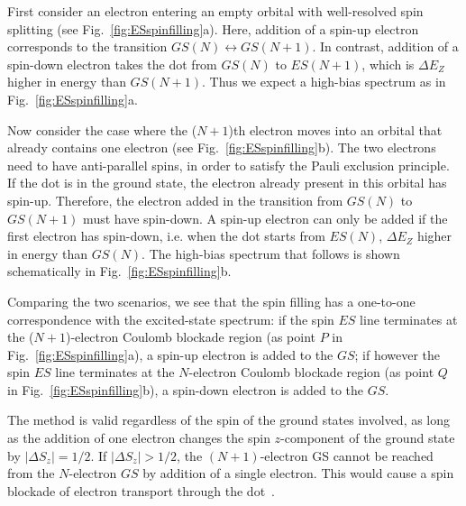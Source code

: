 \documentclass[12pt,aps,nofootinbib]{revtex4-1}
\begin{document}
First consider an electron entering an empty orbital with
well-resolved spin splitting (see Fig.~\ref{fig:ESspinfilling}a).
Here, addition of a spin-up electron corresponds to the transition
$GS(N)\leftrightarrow GS(N\!+\!1)$. In contrast, addition of a
spin-down electron takes the dot from $GS(N)$ to $ES(N\!+\!1)$,
which is $\Delta E_{Z}$ higher in energy than $GS(N\!+\!1)$. Thus
we expect a high-bias spectrum as in
Fig.~\ref{fig:ESspinfilling}a.

Now consider the case where the ($N\!+\!1$)th electron moves into
an orbital that already contains one electron (see
Fig.~\ref{fig:ESspinfilling}b). The two electrons need to have
anti-parallel spins, in order to satisfy the Pauli exclusion
principle. If the dot is in the ground state, the electron already
present in this orbital has spin-up. Therefore, the electron added
in the transition from $GS(N)$ to $GS(N\!+\!1)$ must have
spin-down. A spin-up electron can only be added if the first
electron has spin-down, i.e. when the dot starts from $ES(N)$,
$\Delta E_{Z}$ higher in energy than $GS(N)$. The high-bias
spectrum that follows is shown schematically in
Fig.~\ref{fig:ESspinfilling}b.

Comparing the two scenarios, we see that the spin filling has a
one-to-one correspondence with the excited-state spectrum: if the
spin $ES$ line terminates at the ($N\!+\!1$)-electron Coulomb
blockade region (as point $P$ in Fig.~\ref{fig:ESspinfilling}a), a
spin-up electron is added to the $GS$; if however the spin $ES$
line terminates at the $N$-electron Coulomb blockade region (as
point $Q$ in Fig.~\ref{fig:ESspinfilling}b), a spin-down electron
is added to the $GS$.

The method is valid regardless of the spin of the ground states
involved, as long as the addition of one electron changes the spin
$z$-component of the ground state by $\left|\Delta
S_z\right|=1/2$. If $|\Delta S_z|>1/2$, the $(N+1)$-electron GS
cannot be reached from the $N$-electron $GS$ by addition of a
single electron. This would cause a spin blockade of electron
transport through the dot~\cite{Weinmann}.
\end{document}
